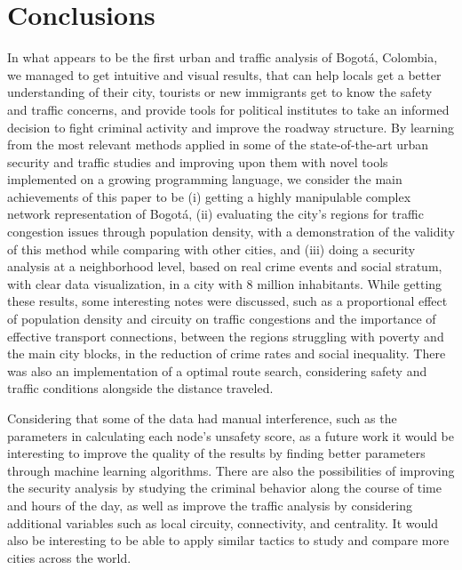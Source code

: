 \documentclass[runningheads]{llncs}
\begin{document}
\section{Conclusions}

In what appears to be the first urban and traffic analysis of Bogotá, Colombia, we managed to get intuitive and visual results, that can help locals get a better understanding of their city, tourists or new immigrants get to know the safety and traffic concerns, and provide tools for political institutes to take an informed decision to fight criminal activity and improve the roadway structure. By learning from the most relevant methods applied in some of the state-of-the-art urban security and traffic studies and improving upon them with novel tools implemented on a growing programming language, we consider the main achievements of this paper to be (i) getting a highly manipulable complex network representation of Bogotá, (ii) evaluating the city's regions for traffic congestion issues through population density, with a demonstration of the validity of this method while comparing with other cities, and (iii) doing a security analysis at a neighborhood level, based on real crime events and social stratum, with clear data visualization, in a city with 8 million inhabitants. While getting these results, some interesting notes were discussed, such as a proportional effect of population density and circuity on traffic congestions and the importance of effective transport connections, between the regions struggling with poverty and the main city blocks, in the reduction of crime rates and social inequality. There was also an implementation of a optimal route search, considering safety and traffic conditions alongside the distance traveled.

Considering that some of the data had manual interference, such as the parameters in calculating each node's unsafety score, as a future work it would be interesting to improve the quality of the results by finding better parameters through machine learning algorithms. There are also the possibilities of improving the security analysis by studying the criminal behavior along the course of time and hours of the day, as well as improve the traffic analysis by considering additional variables such as local circuity, connectivity, and centrality. It would also be interesting to be able to apply similar tactics to study and compare more cities across the world.


\newpage
\printbibliography
\end{document}
